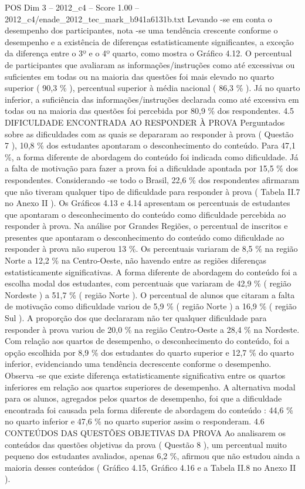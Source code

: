 \begin{textsample}{POS Dim 3 – 2012\_c4 – Score 1.00 – 2012\_c4/enade\_2012\_tec\_mark\_b941a6131b.txt}
Levando -se em conta o desempenho dos participantes, nota -se uma tendência crescente conforme o desempenho e a existência de diferenças estatisticamente significantes, a exceção da diferença entre o 3º e o 4º quarto, como mostra o Gráfico 4.12.
O percentual de participantes que avaliaram as informações/instruções como até excessivas ou suficientes em todas ou na maioria das questões foi mais elevado no quarto superior ( 90,3 \% ), percentual superior à média nacional ( 86,3 \% ).
Já no quarto inferior, a suficiência das informações/instruções declarada como até excessiva em todas ou na maioria das questões foi percebida por 80,9 \% dos respondentes. 4.5 DIFICULDADE ENCONTRADA AO RESPONDER À PROVA Perguntados sobre as dificuldades com as quais se depararam ao responder à prova ( Questão 7 ), 10,8 \% dos estudantes apontaram o desconhecimento do conteúdo.
Para 47,1 \%, a forma diferente de abordagem do conteúdo foi indicada como dificuldade.
Já a falta de motivação para fazer a prova foi a dificuldade apontada por 15,5 \% dos respondentes.
Considerando -se todo o Brasil, 22,6 \% dos respondentes afirmaram que não tiveram qualquer tipo de dificuldade para responder à prova ( Tabela II.7 no Anexo II ).
Os Gráficos 4.13 e 4.14 apresentam os percentuais de estudantes que apontaram o desconhecimento do conteúdo como dificuldade percebida ao responder à prova.
Na análise por Grandes Regiões, o percentual de inscritos e presentes que apontaram o desconhecimento do conteúdo como dificuldade ao responder à prova não superou 13 \%.
Os percentuais variaram de 8,5 \% na região Norte a 12,2 \% na Centro-Oeste, não havendo entre as regiões diferenças estatisticamente significativas.
A forma diferente de abordagem do conteúdo foi a escolha modal dos estudantes, com percentuais que variaram de 42,9 \% ( região Nordeste ) a 51,7 \% ( região Norte ).
O percentual de alunos que citaram a falta de motivação como dificuldade variou de 5,9 \% ( região Norte ) a 16,9 \% ( região Sul ).
A proporção dos que declararam não ter qualquer dificuldade para responder à prova variou de 20,0 \% na região Centro-Oeste a 28,4 \% na Nordeste.
Com relação aos quartos de desempenho, o desconhecimento do conteúdo, foi a opção escolhida por 8,9 \% dos estudantes do quarto superior e 12,7 \% do quarto inferior, evidenciando uma tendência decrescente conforme o desempenho.
Observa -se que existe diferença estatisticamente significativa entre os quartos inferiores em relação aos quartos superiores de desempenho.
A alternativa modal para os alunos, agregados pelos quartos de desempenho, foi que a dificuldade encontrada foi causada pela forma diferente de abordagem do conteúdo : 44,6 \% no quarto inferior e 47,6 \% no quarto superior assim o responderam. 4.6 CONTEÚDOS DAS QUESTÕES OBJETIVAS DA PROVA Ao analisarem os conteúdos das questões objetivas da prova ( Questão 8 ), um percentual muito pequeno dos estudantes avaliados, apenas 6,2 \%, afirmou que não estudou ainda a maioria desses conteúdos ( Gráfico 4.15, Gráfico 4.16 e a Tabela II.8 no Anexo II ).

\end{textsample}
